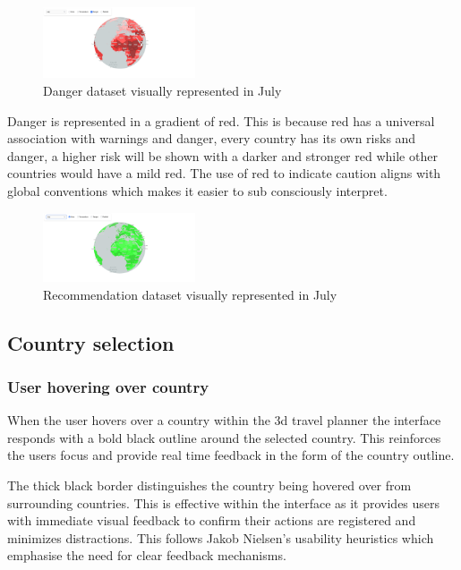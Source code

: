 \documentclass[]{project_final}
\begin{document}
\begin{figure}[ht!]
  \centering
  \includegraphics[width=0.4\textwidth]{6.png}
  \caption{Danger dataset visually represented in July}
  \label{fig:1}
\end{figure}
Danger is represented in a gradient of red. This is because red has a universal association with warnings and danger, every country has its own risks and danger, a higher risk will be shown with a darker and stronger red while other countries would have a mild red. The use of red to indicate caution aligns with global conventions which makes it easier to sub consciously interpret.

\begin{figure}[ht!]
  \centering
  \includegraphics[width=0.4\textwidth]{7.png}
  \caption{Recommendation dataset visually represented in July}
  \label{fig:1}
\end{figure}

\subsection{Country selection}
\subsubsection{User hovering over country}
When the user hovers over a country within the 3d travel planner the interface responds with a bold black outline around the selected country. This reinforces the users focus and provide real time feedback in the form of the country outline.

The thick black border distinguishes the country being hovered over from surrounding countries. This is effective within the interface as it provides users with immediate visual feedback to confirm their actions are registered and minimizes distractions. This follows Jakob Nielsen's usability heuristics which emphasise the need for clear feedback mechanisms.
\end{document}
